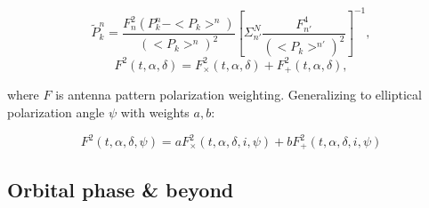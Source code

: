 \begin{equation}
\tilde{P}_{k}^{n}=\frac{F_{n}^{2}(P_{k}^{n}-<P_{k}>^{n})}{(<P_{k}>^{n})^{2}}\left[\Sigma_{n'}^{N}\frac{F_{n'}^{4}}{(<P_{k}>^{n'})^{2}}\right]^{-1},
\label{TwoSpect_pixel_powers}
\end{equation}
\begin{equation}
F^{2}(t,\alpha,\delta)=F_{\times}^{2}(t,\alpha,\delta)+F_{+}^{2}(t,\alpha,\delta),
\label{TwoSpect_pol_powers}
\end{equation}

\noindent where $F$ is antenna pattern polarization weighting.
Generalizing to elliptical polarization angle $\psi$ with weights $a,b$:

\begin{equation}
F^{2}(t,\alpha,\delta,\psi)=aF_{\times}^{2}(t,\alpha,\delta,i,\psi)+bF_{+}^{2}(t,\alpha,\delta,i,\psi)
\label{TwoSpect_elliptical_pol}
\end{equation}



\subsection{Orbital phase \& beyond}


